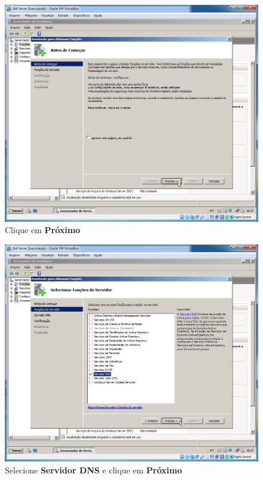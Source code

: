 \documentclass[10pt]{article}
\begin{document}
\begin{figure}[H]
    \centering
    \caption{Clique em \textbf{Próximo}}
    \label{fig:DNS004}
    \includegraphics[width=\linewidth]{images/windows_server/dns/004.png}
\end{figure}
\begin{figure}[H]
    \centering
    \caption{Selecione \textbf{Servidor DNS} e clique em \textbf{Próximo}}
    \label{fig:DNS006}
    \includegraphics[width=\linewidth]{images/windows_server/dns/006.png}
\end{figure}
\end{document}
